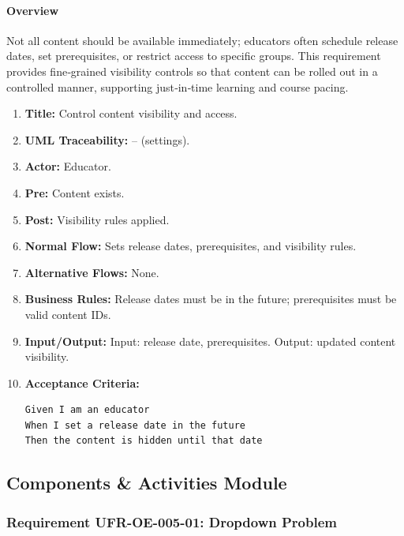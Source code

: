 \paragraph{Overview}
Not all content should be available immediately; educators often schedule release dates, set prerequisites, or restrict access to specific groups. This requirement provides fine‑grained visibility controls so that content can be rolled out in a controlled manner, supporting just‑in‑time learning and course pacing.
\begin{enumerate}[label=\textbf{\arabic*.}]
\item \textbf{Title:} Control content visibility and access.
\item \textbf{UML Traceability:} – (settings).
\item \textbf{Actor:} Educator.
\item \textbf{Pre:} Content exists.
\item \textbf{Post:} Visibility rules applied.
\item \textbf{Normal Flow:} Sets release dates, prerequisites, and visibility rules.
\item \textbf{Alternative Flows:} None.
\item \textbf{Business Rules:} Release dates must be in the future; prerequisites must be valid content IDs.
\item \textbf{Input/Output:} Input: release date, prerequisites. Output: updated content visibility.
\item \textbf{Acceptance Criteria:}
    \begin{verbatim}
Given I am an educator
When I set a release date in the future
Then the content is hidden until that date
    \end{verbatim}
\end{enumerate}

\subsection{Components \& Activities Module}
\subsubsection{Requirement UFR-OE-005-01: Dropdown Problem}
